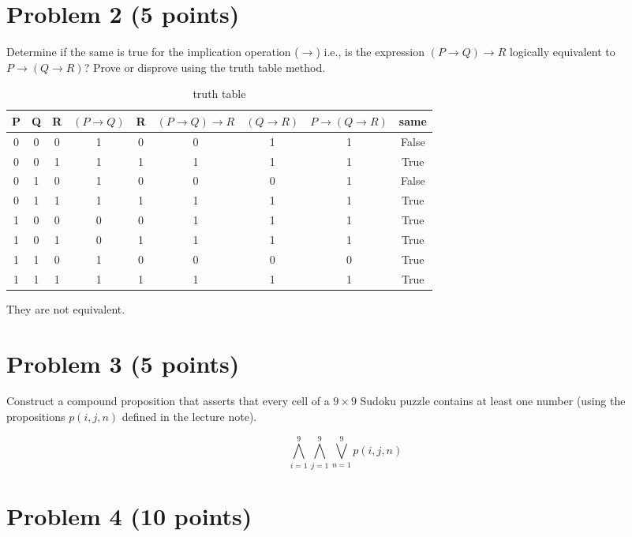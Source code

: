 \documentclass[english]{article}
\begin{document}
\section*{Problem 2 (5 points)}
Determine if the same is true for the implication operation ($\to$)
i.e., is the expression $(P\to Q)\to R$  logically equivalent to $P \to (Q \to R)$?
Prove or disprove using the truth table method. 

\begin{table}[H]
  \begin{center}
  \begin{tabular}{c c c | c | c | c | c | c | c}
      P & Q & R & $(P\to Q)$ & R & $(P\to Q)\to R$ & $(Q\to R)$ & $P\to (Q\to R)$ & same \\
      \hline
      0 & 0 & 0 & 1 & 0 & 0 & 1 & 1 & False \\ 
      0 & 0 & 1 & 1 & 1 & 1 & 1 & 1 & True \\ 
      0 & 1 & 0 & 1 & 0 & 0 & 0 & 1 & False \\ 
      0 & 1 & 1 & 1 & 1 & 1 & 1 & 1 & True \\ 
      1 & 0 & 0 & 0 & 0 & 1 & 1 & 1 & True \\ 
      1 & 0 & 1 & 0 & 1 & 1 & 1 & 1 & True \\ 
      1 & 1 & 0 & 1 & 0 & 0 & 0 & 0 & True \\ 
      1 & 1 & 1 & 1 & 1 & 1 & 1 & 1 & True \\ 
      \hline
  \end{tabular}
  \end{center}
  \caption{\label{tab:table-name} truth table}
\end{table}

They are not equivalent.

\section*{Problem 3 (5 points)}
Construct a compound proposition that asserts that every cell of a $9 \times 9$ Sudoku puzzle contains at least one number (using the propositions $p(i,j,n)$ defined in the lecture note).

$$\bigwedge_{i=1}^9\bigwedge_{j=1}^9\bigvee_{n=1}^9 p(i,j,n)$$

\section*{Problem 4 (10 points)}
\end{document}
